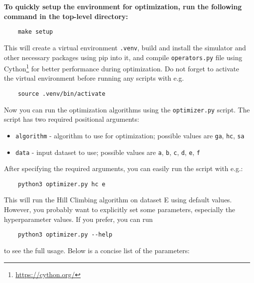 \textbf{To quickly setup the environment for optimization, run the following command in the top-level directory:}
\begin{verbatim}
    make setup
\end{verbatim}
This will create a virtual environment \verb|.venv|, build and install the simulator and other necessary packages using pip into it, and compile \verb|operators.py| file using Cython\footnote{\url{https://cython.org/}} for better performance during optimization. Do not forget to activate the virtual environment before running any scripts with e.g.
\begin{verbatim}
    source .venv/bin/activate
\end{verbatim}
Now you can run the optimization algorithms using the \verb|optimizer.py| script. The script has two required positional arguments:
\begin{itemize}
    \item \verb|algorithm| - algorithm to use for optimization; possible values are \verb|ga|, \verb|hc|, \verb|sa|
    \item \verb|data| - input dataset to use; possible values are \verb|a|, \verb|b|, \verb|c|, \verb|d|, \verb|e|, \verb|f|
\end{itemize}
After specifying the required arguments, you can easily run the script with e.g.:
\begin{verbatim}
    python3 optimizer.py hc e
\end{verbatim}
This will run the Hill Climbing algorithm on dataset E using default values. However, you probably want to explicitly set some parameters, especially the hyperparameter values. If you prefer, you can run
\begin{verbatim}
    python3 optimizer.py --help
\end{verbatim}
to see the full usage. Below is a concise list of the parameters:
